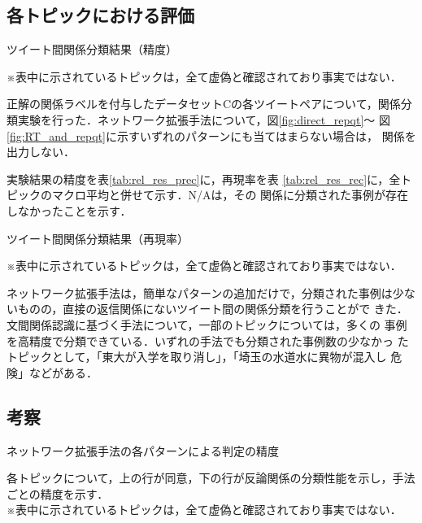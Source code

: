 \documentclass[japanese]{jnlp_1.4}
\newcommand{\addspan}[1]{}
\begin{document}
\subsection{各トピックにおける評価}

\begin{table}[b]
\vspace{-0.8\Cvs}
\caption{ツイート間関係分類結果（精度）} 
\label{tab:rel_res_prec}

\vspace{0.5zw}
\small ※表中に示されているトピックは，全て虚偽と確認されており事実ではない．\par
\end{table}

正解の関係ラベルを付与したデータセットCの各ツイートペアについて，関係分
類実験を行った．ネットワーク拡張手法について，図\ref{fig:direct_repqt}〜
図\ref{fig:RT_and_repqt}に示すいずれのパターンにも当てはまらない場合は，
関係を出力しない．

実験結果の精度を表\ref{tab:rel_res_prec}に，再現率を表
\ref{tab:rel_res_rec}に，全トピックのマクロ平均と併せて示す．N/Aは，その
関係に分類された事例が存在しなかったことを示す．

\begin{table}[t]
\caption{ツイート間関係分類結果（再現率）}
\label{tab:rel_res_rec}

\par\vspace{0.5zw}\small
※表中に示されているトピックは，全て虚偽と確認されており事実ではない．\par
\end{table}


ネットワーク拡張手法は，簡単なパターンの追加だけで，分類された事例は少な
いものの，直接の返信関係にないツイート間の関係分類を行うことがで
きた．文間関係認識に基づく手法について，一部のトピックについては，多くの
事例を高精度で分類できている．いずれの手法でも分類された事例数の少なかっ
たトピックとして，「東大が入学を取り消し」，「埼玉の水道水に異物が混入し
危険」などがある．


\subsection{考察}

\addspan{
本節では，まず，ネットワーク拡張手法の分類結果について考察し，文間関係認
識手法1および2との比較を行う．次に，文間関係認識手法1と2について比較する．
}

\begin{table}[t]
\caption{ネットワーク拡張手法の各パターンによる判定の精度}
 \label{tab:各パターンの精度}

\par\vspace{0.5zw}\small
各トピックについて，上の行が同意，下の行が反論関係の分類性能を示し，手法ごとの精度を示す．\\
※表中に示されているトピックは，全て虚偽と確認されており事実ではない．\par
\end{table}
\end{document}

